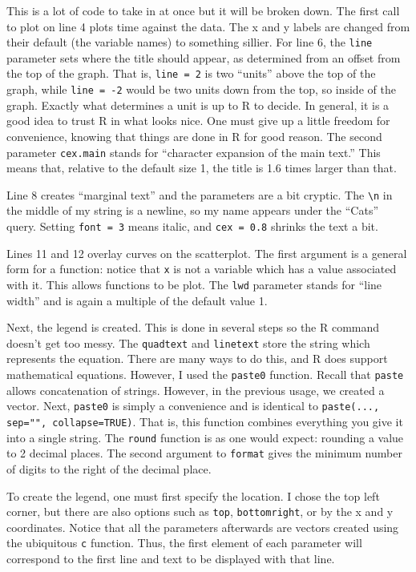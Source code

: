 \documentclass[12pt]{article}
\theoremstyle{remark}
\begin{document}
This is a lot of code to take in at once but it will be broken down. The first call to plot on line 4 plots time against the data. The x and y labels are changed from their default (the variable names) to something sillier. For line 6, the \verb|line| parameter sets where the title should appear, as determined from an offset from the top of the graph. That is, \verb|line = 2| is two ``units'' above the top of the graph, while \verb|line = -2| would be two units down from the top, so inside of the graph. Exactly what determines a unit is up to R to decide. In general, it is a good idea to trust R in what looks nice. One must give up a little freedom for convenience, knowing that things are done in R for good reason. The second parameter \verb|cex.main| stands for ``character expansion of the main text.'' This means that, relative to the default size 1, the title is 1.6 times larger than that.

Line 8 creates ``marginal text'' and the parameters are a bit cryptic. The \verb|\n| in the middle of my string is a newline, so my name appears under the ``Cats'' query. Setting \verb|font = 3| means italic, and \verb|cex = 0.8| shrinks the text a bit. 

Lines 11 and 12 overlay curves on the scatterplot. The first argument is a general form for a function: notice that \verb|x| is not a variable which has a value associated with it. This allows functions to be plot. The \verb|lwd| parameter stands for ``line width'' and is again a multiple of the default value 1.

Next, the legend is created. This is done in several steps so the R command doesn't get too messy. The \verb|quadtext| and \verb|linetext| store the string which represents the equation. There are many ways to do this, and R does support mathematical equations. However, I used the \verb|paste0| function. Recall that \verb|paste| allows concatenation of strings. However, in the previous usage, we created a vector. Next, \verb|paste0| is simply a convenience and is identical to \verb|paste(..., sep="", collapse=TRUE)|. That is, this function combines everything you give it into a single string. The \verb|round| function is as one would expect: rounding a value to 2 decimal places. The second argument to \verb|format| gives the minimum number of digits to the right of the decimal place.

To create the legend, one must first specify the location. I chose the top left corner, but there are also options such as \verb|top|, \verb|bottomright|, or by the x and y coordinates. Notice that all the parameters afterwards are vectors created using the ubiquitous \verb|c| function. Thus, the first element of each parameter will correspond to the first line and text to be displayed with that line.
\end{document}
